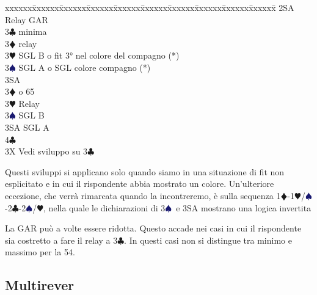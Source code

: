 \documentclass[a4paper,italian]{article}
\newcommand{\BC}{\textcolor{OliveGreen}{$\clubsuit$}}
\newcommand{\BD}{\textcolor{RedOrange}{$\vardiamondsuit$}}
\newcommand{\BH}{\textcolor{Red2}{$\varheartsuit${}}}
\newcommand{\BS}{\textcolor{MidnightBlue}{$\spadesuit${}}}
\newenvironment{bidtable}
{\begin{tabbing}

    xxxxxx\=xxxxxx\=xxxxxx\=xxxxxx\=xxxxxx\=xxxxxx\=xxxxxx\=xxxxxx\=xxxxxx\=xxxxxx\=\kill}
{\end{tabbing} }%
\newenvironment{attenzione}[1]
{\begin{tcolorbox}[colframe=red!80!white,title=#1]}
    {
\end{tcolorbox} }%
\begin{document}
                                \begin{bidtable}
                                    2SA \> Relay GAR\+\\
                                    3\BC {} minima\+\\
                                    3\BD \> relay\+\\
                                    3\BH \> SGL B o fit 3° nel colore del compagno (*)\\
                                    3\BS \> SGL A o SGL colore compagno (*)\\
                                    3SA \-\-\\
                                    3\BD {} o 65\+\\
                                    3\BH \> Relay\+\\
                                    3\BS \> SGL B\\
                                    3SA \> SGL A\\
                                    4\BC {}\-\-\\
                                    3X \> Vedi sviluppo su 3\BC \-
                                \end{bidtable}
                                \bigbreak
                                \begin{attenzione}{ATTENZIONE(*)}
                                    Questi sviluppi si applicano solo quando siamo in una situazione di fit non esplicitato e in cui il rispondente abbia mostrato un colore. Un'ulteriore eccezione, che verrà rimarcata quando la incontreremo, è sulla sequenza 1\BD -1\BH/\BS-2\BC -2\BS/\BH, nella quale le dichiarazioni di 3\BS\ e 3SA mostrano una logica invertita
                                \end{attenzione}
                                \bigbreak
                                La GAR può a volte essere ridotta. Questo accade nei casi in cui il rispondente sia costretto a fare il relay a 3\BC . In questi casi non si distingue tra minimo e massimo per la 54.
                                \bigbreak
                                \subsection{Multirever}\label{multirever}
\end{document}
